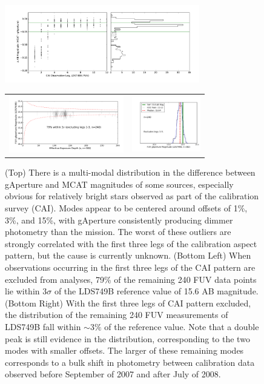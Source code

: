 \documentclass[iop]{emulateapj}
\begin{document}
\begin{figure}[h!]
\includegraphics[width=8.5cm,keepaspectratio]{Fig09a.pdf}\\
\begin{tabular}{cc}
\includegraphics[width=5cm,keepaspectratio]{Fig09b.pdf}&
\includegraphics[width=3cm,keepaspectratio]{Fig09c.pdf}\\
\end{tabular}
\caption{(Top) There is a multi-modal distribution in the difference between gAperture and MCAT magnitudes of some sources, especially obvious for relatively bright stars observed as part of the calibration survey (CAI). Modes appear to be centered around offsets of 1\%, 3\%, and 15\%, with gAperture consistently producing dimmer photometry than the mission. The worst of these outliers are strongly correlated with the first three legs of the calibration aspect pattern, but the cause is currently unknown. (Bottom Left) When observations occurring in the first three legs of the CAI pattern are excluded from analyses, 79\% of the remaining 240 FUV data points lie within 3$\sigma$ of the LDS749B reference value of 15.6 AB magnitude. (Bottom Right) With the first three legs of CAI pattern excluded, the distribution of the remaining 240 FUV measurements of LDS749B fall within $\sim3\%$ of the reference value. Note that a double peak is still evidence in the distribution, corresponding to the two modes with smaller offsets. The larger of these remaining modes corresponds to a bulk shift in photometry between calibration data observed before September of 2007 and after July of 2008.
\label{multimodal}}
\end{figure}
\end{document}
